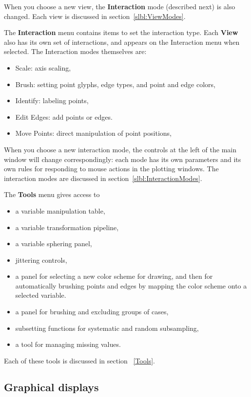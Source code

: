 \documentclass[11pt]{article}
\def\Widget#1{\textbf{#1}}
\begin{document}
When you choose a new view, the \Widget{Interaction} mode (described
next) is also changed.  Each view is discussed in
section~\ref{slbl:ViewModes}.

The \Widget{Interaction} menu contains items to set the interaction type.
Each \Widget{View} also has its own set of interactions, and appears on
the Interaction menu when selected.  The Interaction modes
themselves are:

\begin{itemize}
\itemsep 0em
\item Scale: axis scaling,
\item Brush: setting point glyphs, edge types, and point and edge colors,
\item Identify: labeling points,
\item Edit Edges: add points or edges.
\item Move Points: direct manipulation of point positions,
\end{itemize}

When you choose a new interaction mode, the controls at the left of
the main window will change correspondingly: each mode has its own
parameters and its own rules for responding to mouse actions in the
plotting windows.  The interaction modes are discussed in
section~\ref{slbl:InteractionModes}.

The \Widget{Tools} menu gives access to 
\begin{itemize}
\itemsep 0em
\item a variable manipulation table,
\item a variable transformation pipeline,
\item a variable sphering panel,
\item jittering controls,
\item a panel for selecting a new color scheme for drawing, and
 then for automatically brushing points and edges by mapping the
 color scheme onto a selected variable.
\item a panel for brushing and excluding groups of cases,
\item subsetting functions for systematic and random subsampling, 
\item a tool for managing missing values.
\end{itemize}

Each of these tools is discussed in section ~\ref{Tools}.

\subsection{Graphical displays}
\label{slbl:GraphicalDisplays}
\end{document}
